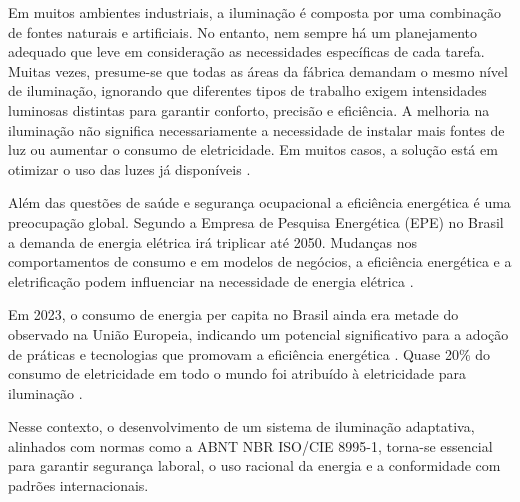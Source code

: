 Em muitos ambientes industriais, a iluminação é composta por uma combinação de fontes naturais e artificiais. No entanto, nem sempre há um planejamento adequado que leve em consideração as necessidades específicas de cada tarefa. Muitas vezes, presume-se que todas as áreas da fábrica demandam o mesmo nível de iluminação, ignorando que diferentes tipos de trabalho exigem intensidades luminosas distintas para garantir conforto, precisão e eficiência. A melhoria na iluminação não significa necessariamente a necessidade de instalar mais fontes de luz ou aumentar o consumo de eletricidade. Em muitos casos, a solução está em otimizar o uso das luzes já disponíveis \cite{ILO2007}.

Além das questões de saúde e segurança ocupacional a eficiência energética é uma preocupação global. Segundo a Empresa de Pesquisa Energética (\gls{EPE}) no Brasil a demanda de energia elétrica irá triplicar até 2050. Mudanças nos comportamentos de consumo e em modelos de negócios, a eficiência energética e a eletrificação podem influenciar na necessidade de energia elétrica \cite{EPE2025}.

Em 2023, o consumo de energia per capita no Brasil ainda era metade do observado na União Europeia, indicando um potencial significativo para a adoção de práticas e tecnologias que promovam a eficiência energética \cite{EPE2025}. Quase 20\% do consumo de eletricidade em todo o mundo foi atribuído à eletricidade para iluminação \cite{UNEP2013}.

Nesse contexto, o desenvolvimento de um sistema de iluminação adaptativa, alinhados com normas como a ABNT NBR ISO/CIE 8995-1, torna-se essencial para garantir segurança laboral, o uso racional da energia e a conformidade com padrões internacionais.

